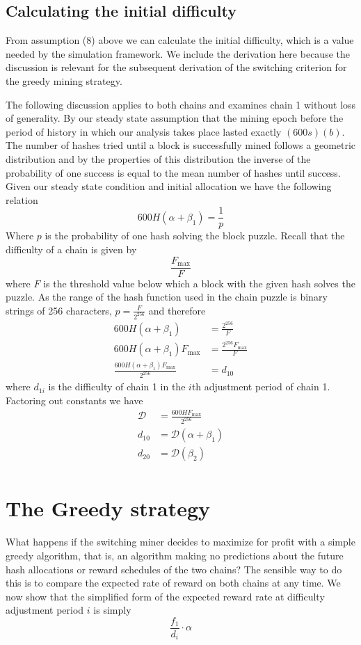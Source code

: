 \documentclass[12pt, preprint]{aastex}
\begin{document}
\subsection*{Calculating the initial difficulty}

From assumption (8) above we can calculate the initial difficulty, which is a value needed by the simulation framework.  We include the derivation here because the discussion is relevant for the subsequent derivation of the switching criterion for the greedy mining strategy.  

The following discussion applies to both chains and examines chain 1 without loss of generality.  By our steady state assumption that the mining epoch before the period of history in which our analysis takes place lasted exactly $(600 s)(b)$.  The number of hashes tried until a block is successfully mined follows a geometric distribution and by the properties of this distribution the inverse of the probability of one success is equal to the mean number of hashes until success.  Given our steady state condition and initial allocation we have the following relation
$$
600 H(\alpha+ \beta_1) = \frac{1}{p}
$$
Where $p$ is the probability of one hash solving the block puzzle.
Recall that the difficulty of a chain is given by
$$
\frac{F_{\text{max}}}{F}
$$
where $F$ is the threshold value below which a block with the given hash solves the puzzle.  As the range of the hash function used in the chain puzzle is binary strings of 256 characters, $p = \frac{F}{2^{256}}$ and therefore
\begin{align*}
600 H(\alpha + \beta_1) &= \frac{2^{256}}{F}\\
600 H(\alpha + \beta_1)F_{\text{max}} &= \frac{2^{256}F_{\text{max}}}{F}\\
\frac{600 H(\alpha + \beta_1)F_{\text{max}} }{2^{256}} &= d_{10}
\end{align*}
where $d_{1i}$ is the difficulty of chain 1 in the $i$th adjustment period of chain 1.  Factoring out constants we have
\begin{align*}
\mathcal{D} &= \frac{600 HF_{\text{max}} }{2^{256}}\\
d_{10} &= \mathcal{D} (\alpha + \beta_1)\\
d_{20} &= \mathcal{D} (\beta_2)\\
\end{align*}

\section*{The Greedy strategy}
What happens if the switching miner decides to maximize for profit with a simple greedy algorithm, that is, an algorithm making no predictions about the future hash allocations or reward schedules of the two chains?  The sensible way to do this is to compare the expected rate of reward on both chains at any time.  We now show that the simplified form of the expected reward rate at difficulty adjustment period $i$ is simply $$\frac{f_1}{d_i} \cdot \alpha$$
\end{document}
